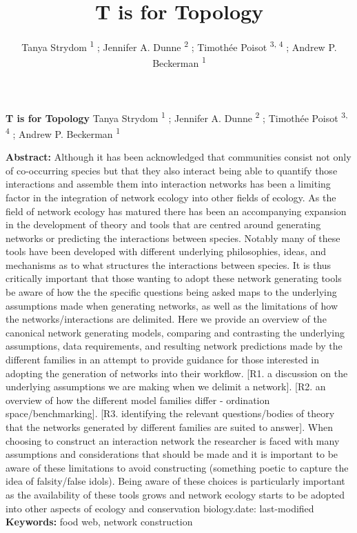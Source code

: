 \documentclass[
]{article}
\title{T is for Topology}
\author{Tanya Strydom %
%
\textsuperscript{%
%
1%
}%
; Jennifer A. Dunne %
%
\textsuperscript{%
%
2%
}%
; Timothée Poisot %
%
\textsuperscript{%
3,%
4%
}%
; Andrew P. Beckerman %
%
\textsuperscript{%
%
1%
}%
}
\date{}
\begin{document}
\thispagestyle{empty}
{\bfseries\sffamily\Large T is for Topology}
\vfil
Tanya Strydom %
%
\textsuperscript{%
%
1%
}%
; Jennifer A. Dunne %
%
\textsuperscript{%
%
2%
}%
; Timothée Poisot %
%
\textsuperscript{%
3,%
4%
}%
; Andrew P. Beckerman %
%
\textsuperscript{%
%
1%
}%

\vfil
{\small
\textbf{Abstract:} Although it has been acknowledged that communities
consist not only of co-occurring species but that they also interact
being able to quantify those interactions and assemble them into
interaction networks has been a limiting factor in the integration of
network ecology into other fields of ecology. As the field of network
ecology has matured there has been an accompanying expansion in the
development of theory and tools that are centred around generating
networks or predicting the interactions between species. Notably many of
these tools have been developed with different underlying philosophies,
ideas, and mechanisms as to what structures the interactions between
species. It is thus critically important that those wanting to adopt
these network generating tools be aware of how the the specific
questions being asked maps to the underlying assumptions made when
generating networks, as well as the limitations of how the
networks/interactions are delimited. Here we provide an overview of the
canonical network generating models, comparing and contrasting the
underlying assumptions, data requirements, and resulting network
predictions made by the different families in an attempt to provide
guidance for those interested in adopting the generation of networks
into their workflow. {[}R1. a discussion on the underlying assumptions
we are making when we delimit a network{]}. {[}R2. an overview of how
the different model families differ - ordination space/benchmarking{]}.
{[}R3. identifying the relevant questions/bodies of theory that the
networks generated by different families are suited to answer{]}. When
choosing to construct an interaction network the researcher is faced
with many assumptions and considerations that should be made and it is
important to be aware of these limitations to avoid constructing
(something poetic to capture the idea of falsity/false idols). Being
aware of these choices is particularly important as the availability of
these tools grows and network ecology starts to be adopted into other
aspects of ecology and conservation biology.date: last-modified
\vfil
\textbf{Keywords:} %
food web, %
network construction%
}
\clearpage
\setcounter{page}{1}
\doublespacing
\linenumbers
\end{document}
